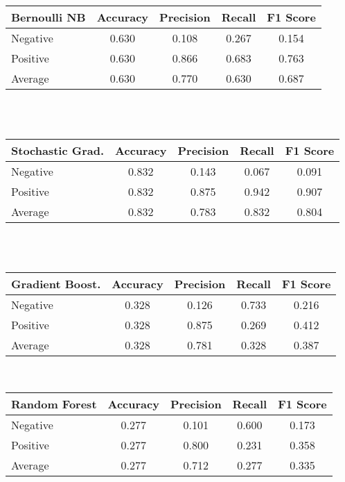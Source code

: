 \documentclass[letterpaper]{article}
\begin{document}
{\noindent\begin{tabular}{C{2cm} | c c c c}
\textbf{Bernoulli NB}  & Accuracy  & Precision & Recall    & F1 Score  \\
\hline
Negative        & 0.630     & 0.108     & 0.267     & 0.154     \\
Positive        & 0.630     & 0.866     & 0.683     & 0.763     \\
Average         & 0.630     & 0.770     & 0.630     & 0.687     \\
\end{tabular} \\ \\



\noindent\begin{tabular}{C{2cm} | c c c c}
\textbf{Stochastic Grad.}    & Accuracy  & Precision & Recall    & F1 Score  \\
\hline
Negative        & 0.832     & 0.143     & 0.067     & 0.091     \\
Positive        & 0.832     & 0.875     & 0.942     & 0.907     \\
Average         & 0.832     & 0.783     & 0.832     & 0.804     \\
\end{tabular} \\ \\



\noindent\begin{tabular}{C{2cm} | c c c c}
\textbf{Gradient Boost.}   & Accuracy  & Precision & Recall    & F1 Score  \\
\hline
Negative        & 0.328     & 0.126     & 0.733     & 0.216     \\
Positive        & 0.328     & 0.875     & 0.269     & 0.412     \\
Average         & 0.328     & 0.781     & 0.328     & 0.387     \\
\end{tabular} \\



\noindent\begin{tabular}{C{2cm} | c c c c}
\textbf{Random Forest}   & Accuracy  & Precision & Recall    & F1 Score  \\
\hline
Negative        & 0.277     & 0.101     & 0.600     & 0.173     \\
Positive        & 0.277     & 0.800     & 0.231     & 0.358     \\
Average         & 0.277     & 0.712     & 0.277     & 0.335     \\
\end{tabular} \\ \\



}
\end{document}
